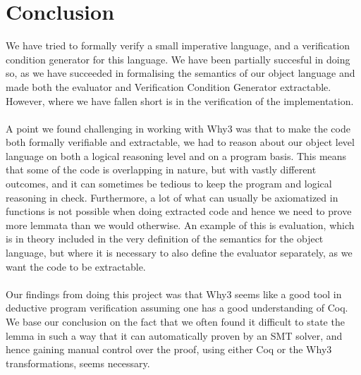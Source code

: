 \section{Conclusion}\label{sec:conclusion}
We have tried to formally verify a small imperative language, and a verification condition generator for this language.
We have been partially succesful in doing so,
as we have succeeded in formalising the semantics of our object language and made both the evaluator and Verification Condition Generator extractable.
However, where we have fallen short is in the verification of the implementation.
\\~\\
A point we found challenging in working with Why3 was that to make the code both formally verifiable and
extractable, we had to reason about our object level language on both a logical reasoning level and on a
program basis.
This means that some of the code is overlapping in nature, but with vastly different outcomes, and it can sometimes be tedious to keep the program and logical reasoning in check.
Furthermore, a lot of what can usually be axiomatized in functions is not possible when doing extracted code and hence we need to prove more lemmata than we would otherwise.
An example of this is evaluation, which is in theory included in the very definition of the semantics for the
object language, but where it is necessary to also define the evaluator separately, as we want the code to be extractable.
\\~\\
Our findings from doing this project was that Why3 seems like a good tool in deductive program verification assuming one has a good understanding of Coq.
We base our conclusion on the fact that we often found it difficult to state the lemma in such a way that it can automatically proven by an SMT solver, and hence gaining manual control over the proof, using either Coq or the Why3 transformations, seems necessary.
